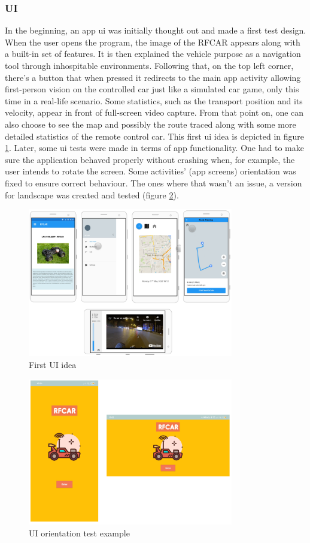 \subsubsection{UI}%
\label{sec:user-interface}
In the beginning, an app \gls{ui} was initially thought out and made a first test design.
When the user opens the program, the image of the RFCAR appears along with a built-in set of features. It is then explained the vehicle purpose as a navigation tool through inhospitable environments.
%
Following that, on the top left corner, there's a button that when pressed it redirects to the main app activity allowing first-person vision on the controlled car just like a simulated car game, only this time in a real-life scenario. Some statistics, such as the transport position and its velocity, appear in front of full-screen video capture.
%
From that point on, one can also choose to see the map and possibly the route traced along with some more detailed statistics of the remote control car. This first \gls{ui} idea is depicted in figure \ref{fig:first-ui-idea}. Later, some \gls{ui} tests were made in terms of app functionality. One had to make sure the application behaved properly without crashing when, for example, the user intends to rotate the screen. Some activities' (app screens) orientation was fixed to ensure correct behaviour. The ones where that wasn't an issue, a version for landscape was created and tested (figure \ref{fig:orientation-test}). 
%
\begin{figure}[!ht]
\centering
\includegraphics[width=0.8\textwidth]{img/Initial-app-idea.png}
\caption{\label{fig:first-ui-idea}First UI idea}
\end{figure}
%
\begin{figure}[!ht]
\centering
\includegraphics[width=0.8\textwidth]{img/orientation-test.png}
\caption{\label{fig:orientation-test}UI orientation test example}
\end{figure}
